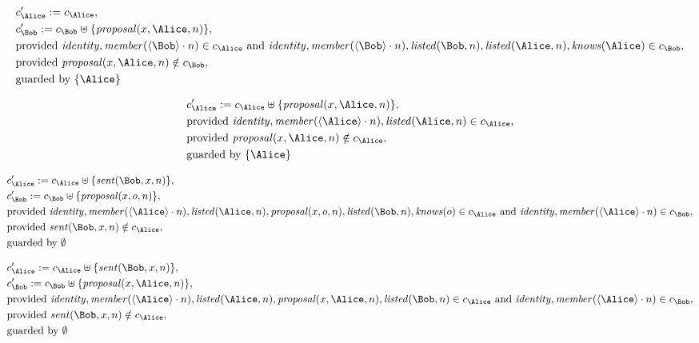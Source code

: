 \begin{align*}
&
c'_
{
\Alice
}
 := 
c_
{
\Alice
}
,\\
&
c'_
{
\Bob
}
 := 
c_
{
\Bob
}
 \uplus 
\{
\mathit{
proposal
}
(
x
,
\Alice
,
n
)
\}
,\\
&
\text{provided } 
\mathit{
identity
}
,
\mathit{
member
}
(
\langle
\Bob
\rangle
\cdot
n
)
 \in c_
{
\Alice
}
 \text{ and } 
\mathit{
identity
}
,
\mathit{
member
}
(
\langle
\Bob
\rangle
\cdot
n
)
,
\mathit{
listed
}
(
\Bob
,
n
)
,
\mathit{
listed
}
(
\Alice
,
n
)
,
\mathit{
knows
}
(
\Alice
)
 \in c_
{
\Bob
}
,\\
&
\text{provided } 
\mathit{
proposal
}
(
x
,
\Alice
,
n
)
 \notin c_
{
\Bob
}
,\\
&
\text{guarded by } \{
\Alice
\}
\end{align*}

\begin{align*}
&
c'_
{
\Alice
}
 := 
c_
{
\Alice
}
 \uplus 
\{
\mathit{
proposal
}
(
x
,
\Alice
,
n
)
\}
,\\
&
\text{provided } 
\mathit{
identity
}
,
\mathit{
member
}
(
\langle
\Alice
\rangle
\cdot
n
)
,
\mathit{
listed
}
(
\Alice
,
n
)
 \in c_
{
\Alice
}
,\\
&
\text{provided } 
\mathit{
proposal
}
(
x
,
\Alice
,
n
)
 \notin c_
{
\Alice
}
,\\
&
\text{guarded by } \{
\Alice
\}
\end{align*}

\begin{align*}
&
c'_
{
\Alice
}
 := 
c_
{
\Alice
}
 \uplus 
\{
\mathit{
sent
}
(
\Bob
,
x
,
n
)
\}
,\\
&
c'_
{
\Bob
}
 := 
c_
{
\Bob
}
 \uplus 
\{
\mathit{
proposal
}
(
x
,
o
,
n
)
\}
,\\
&
\text{provided } 
\mathit{
identity
}
,
\mathit{
member
}
(
\langle
\Alice
\rangle
\cdot
n
)
,
\mathit{
listed
}
(
\Alice
,
n
)
,
\mathit{
proposal
}
(
x
,
o
,
n
)
,
\mathit{
listed
}
(
\Bob
,
n
)
,
\mathit{
knows
}
(
o
)
 \in c_
{
\Alice
}
 \text{ and } 
\mathit{
identity
}
,
\mathit{
member
}
(
\langle
\Alice
\rangle
\cdot
n
)
 \in c_
{
\Bob
}
,\\
&
\text{provided } 
\mathit{
sent
}
(
\Bob
,
x
,
n
)
 \notin c_
{
\Alice
}
,\\
&
\text{guarded by } \emptyset
\end{align*}

\begin{align*}
&
c'_
{
\Alice
}
 := 
c_
{
\Alice
}
 \uplus 
\{
\mathit{
sent
}
(
\Bob
,
x
,
n
)
\}
,\\
&
c'_
{
\Bob
}
 := 
c_
{
\Bob
}
 \uplus 
\{
\mathit{
proposal
}
(
x
,
\Alice
,
n
)
\}
,\\
&
\text{provided } 
\mathit{
identity
}
,
\mathit{
member
}
(
\langle
\Alice
\rangle
\cdot
n
)
,
\mathit{
listed
}
(
\Alice
,
n
)
,
\mathit{
proposal
}
(
x
,
\Alice
,
n
)
,
\mathit{
listed
}
(
\Bob
,
n
)
 \in c_
{
\Alice
}
 \text{ and } 
\mathit{
identity
}
,
\mathit{
member
}
(
\langle
\Alice
\rangle
\cdot
n
)
 \in c_
{
\Bob
}
,\\
&
\text{provided } 
\mathit{
sent
}
(
\Bob
,
x
,
n
)
 \notin c_
{
\Alice
}
,\\
&
\text{guarded by } \emptyset
\end{align*}
